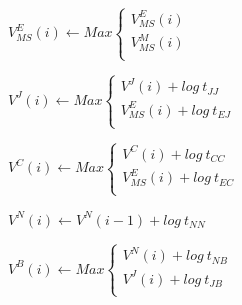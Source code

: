 \begin{algorithm}[htb!]
\begin{algorithmic}
	\State	$ V^E_{MS} (i) \gets Max \begin{cases} 
				 V^E_{MS} (i) \\
				 V^M_{MS} (i) \\
				\end{cases} $
	
	\State	$ V^J (i) \gets Max \begin{cases} 
				V^J (i) + log\ t_{J J}  \\
				V^E_{MS} (i) + log\ t_{E J} \\
				\end{cases} $	
					
	\State	$ V^C (i) \gets Max \begin{cases} 
				V^C (i) + log\ t_{C C}  \\
				V^E_{MS} (i) + log\ t_{E C} \\
				\end{cases} $
  
	\State	$ V^N (i) \gets V^N (i-1) + log\ t_{N N} $

	\State	$ V^B (i) \gets Max \begin{cases} 
				V^N (i) + log\ t_{N B}  \\
				V^J (i) + log\ t_{J B} \\
				\end{cases} $	
\EndFor
\end{algorithmic}
\end{algorithm}

\clearpage



